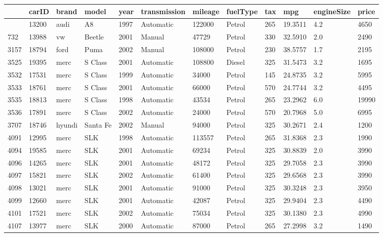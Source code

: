 \documentclass[
  letterpaper,
  DIV=11,
  numbers=noendperiod]{scrreprt}
\begin{document}
\begin{longtable}[]{@{}llllllllllll@{}}
\toprule\noalign{}
& carID & brand & model & year & transmission & mileage & fuelType & tax
& mpg & engineSize & price \\
\midrule\noalign{}
\endhead
\bottomrule\noalign{}
\endlastfoot
330 & 13200 & audi & A8 & 1997 & Automatic & 122000 & Petrol & 265 &
19.3511 & 4.2 & 4650 \\
732 & 13988 & vw & Beetle & 2001 & Manual & 47729 & Petrol & 330 &
32.5910 & 2.0 & 2490 \\
3157 & 18794 & ford & Puma & 2002 & Manual & 108000 & Petrol & 230 &
38.5757 & 1.7 & 2195 \\
3525 & 19395 & merc & S Class & 2001 & Automatic & 108800 & Diesel & 325
& 31.5473 & 3.2 & 1695 \\
3532 & 17531 & merc & S Class & 1999 & Automatic & 34000 & Petrol & 145
& 24.8735 & 3.2 & 5995 \\
3533 & 18761 & merc & S Class & 2001 & Automatic & 66000 & Petrol & 570
& 24.7744 & 3.2 & 4495 \\
3535 & 18813 & merc & S Class & 1998 & Automatic & 43534 & Petrol & 265
& 23.2962 & 6.0 & 19990 \\
3536 & 17891 & merc & S Class & 2002 & Automatic & 24000 & Petrol & 570
& 20.7968 & 5.0 & 6995 \\
3707 & 18746 & hyundi & Santa Fe & 2002 & Manual & 94000 & Petrol & 325
& 30.2671 & 2.4 & 1200 \\
4091 & 12995 & merc & SLK & 1998 & Automatic & 113557 & Petrol & 265 &
31.8368 & 2.3 & 1990 \\
4094 & 19585 & merc & SLK & 2001 & Automatic & 69234 & Petrol & 325 &
30.8839 & 2.0 & 3990 \\
4096 & 14265 & merc & SLK & 2001 & Automatic & 48172 & Petrol & 325 &
29.7058 & 2.3 & 3990 \\
4097 & 15821 & merc & SLK & 2002 & Automatic & 61400 & Petrol & 325 &
29.6568 & 2.3 & 3990 \\
4098 & 13021 & merc & SLK & 2001 & Automatic & 91000 & Petrol & 325 &
30.3248 & 2.3 & 3950 \\
4099 & 12660 & merc & SLK & 2001 & Automatic & 42087 & Petrol & 325 &
29.9404 & 2.3 & 4490 \\
4101 & 17521 & merc & SLK & 2002 & Automatic & 75034 & Petrol & 325 &
30.1380 & 2.3 & 4990 \\
4107 & 13977 & merc & SLK & 2000 & Automatic & 87000 & Petrol & 265 &
27.2998 & 3.2 & 1490 \\

\end{longtable}
\end{document}
